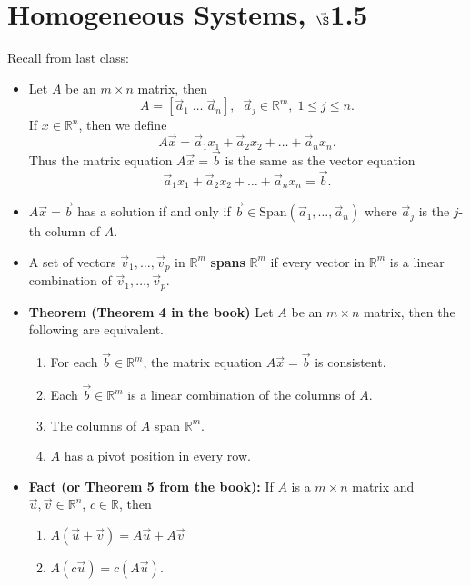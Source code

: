 


%


\section{{Homogeneous Systems, $\vec\S$1.5}}%
% 

%
\thispagestyle{fancy}


Recall from last class:

\begin{itemize}

\item Let $A$ be an $m \times n$ matrix, then $$A = [ \vec{a}_1\; \dots \; \vec{a}_n], \; \; \vec{a}_j \in \mathbb{R}^m,\; 1\leq j \leq n.$$  
If $x \in \mathbb{R}^n$, then we define $$A \vec{x} = \vec{a}_1 x_1 + \vec{a}_2 x_2 +\dots + \vec{a}_n x_n.$$ Thus the matrix equation $A\vec{x} =\vec{b}$ is the same as the vector equation $$\vec{a}_1 x_1 + \vec{a}_2 x_2 +\dots + \vec{a}_n x_n=\vec{b}.$$
\item $A\vec{x} =\vec{b}$ has a solution if and only if $\vec{b} \in \text{Span}(\vec{a}_1,\dots, \vec{a}_n)$ where $\vec{a}_j$ is the $j$-th column of $A$.
\item A set of vectors $\vec{v}_1, \dots, \vec{v}_p$ in $\mathbb{R}^m$ {\bf spans} $\mathbb{R}^m$ if every vector in $\mathbb{R}^m$ is a linear combination of $\vec{v}_1, \dots, \vec{v}_p$.
\item {\bf Theorem (Theorem 4 in the book)} Let $A$ be an $m \times n$ matrix, then the following are equivalent.
\begin{enumerate}
\item For each $\vec{b} \in \mathbb{R}^m$, the matrix equation $A \vec{x} =\vec{b}$ is consistent.
\item Each $\vec{b} \in \mathbb{R}^m$ is a linear combination of the columns of $A$.
\item The columns of $A$ span $\mathbb{R}^m$.
\item $A$ has a pivot position in every row.
\end{enumerate}
\item {\bf Fact (or Theorem 5 from the book):} If $A$ is a $m \times n$ matrix and $\vec{u}, \vec{v} \in \mathbb{R}^n$, $c\in \mathbb{R}$, then
\begin{enumerate}
\item $A(\vec{u} +\vec{v})=A\vec{u} +A\vec{v}$
\item $A(c \vec{u}) =c (A\vec{u}).$
\end{enumerate}
\end{itemize}

